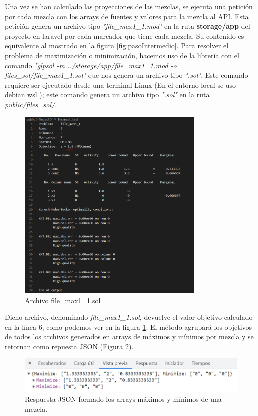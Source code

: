 Una vez se han calculado las proyecciones de las mezclas, se ejecuta una petición por cada mezcla con los arrays de fuentes y valores para la mezcla al API. Esta petición genera un archivo tipo \textit{"file\_max1\_1.mod"} en la ruta \textbf{storage/app} del  proyecto en laravel por cada marcador que tiene cada mezcla. Su contenido es equivalente al mostrado en la figura \ref{fig:pasoIntermedio}. Para resolver el problema de maximización o minimización, hacemos uso de la librería \cite{glpk:package} con el comando \textit{"glpsol -m ../storage/app/file\_max1\_1.mod -o files\_sol/file\_max1\_1.sol"} que nos genera un archivo tipo \textit{".sol"}. Este comando requiere  ser ejecutado desde una terminal Linux (En el entorno local se uso debian wsl \cite{debian}); este comando genera un archivo tipo \textit{".sol"} en la ruta \textit{public/files\_sol/}.

\begin{figure}[h!] 
\centering
    \includegraphics[width=0.8\textwidth]{img/fileSol.PNG}
\caption{Archivo file\_max1\_1.sol }
\label{fig:fileSol}
\end{figure}

Dicho archivo, denominado \textit{file\_max1\_1.sol}, devuelve el valor objetivo calculado en la línea $6$, como podemos ver en la figura \ref{fig:fileSol}. El método agrupará los objetivos de todos los archivos generados en arrays de máximos y mínimos por mezcla y se retornan como repuesta JSON (Figura \ref{fig:respuestaJson}).

\begin{figure}[h!] 
\centering
    \includegraphics[width=1\textwidth]{img/respuestaJsonMax.PNG}
\caption{Respuesta JSON formado los arrays máximos y mínimos de una mezcla. }
\label{fig:respuestaJson}
\end{figure}


